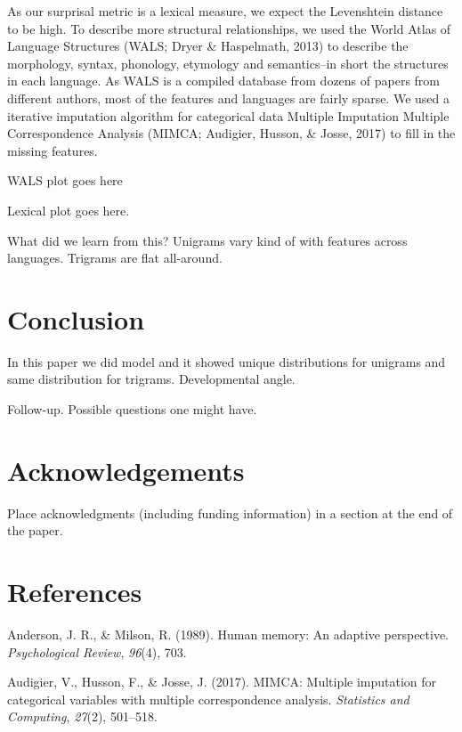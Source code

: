 \documentclass[10pt, letterpaper]{article}
\begin{document}
As our surprisal metric is a lexical measure, we expect the Levenshtein
distance to be high. To describe more structural relationships, we used
the World Atlas of Language Structures (WALS; Dryer \& Haspelmath, 2013)
to describe the morphology, syntax, phonology, etymology and
semantics--in short the structures in each language. As WALS is a
compiled database from dozens of papers from different authors, most of
the features and languages are fairly sparse. We used a iterative
imputation algorithm for categorical data Multiple Imputation Multiple
Correspondence Analysis (MIMCA; Audigier, Husson, \& Josse, 2017) to
fill in the missing features.

WALS plot goes here

Lexical plot goes here.

What did we learn from this? Unigrams vary kind of with features across
languages. Trigrams are flat all-around.

\hypertarget{conclusion}{%
\section{Conclusion}\label{conclusion}}

In this paper we did model and it showed unique distributions for
unigrams and same distribution for trigrams. Developmental angle.

Follow-up. Possible questions one might have.

\hypertarget{acknowledgements}{%
\section{Acknowledgements}\label{acknowledgements}}

Place acknowledgments (including funding information) in a section at
the end of the paper.

\hypertarget{references}{%
\section{References}\label{references}}

\setlength{\parindent}{-0.1in} 
\setlength{\leftskip}{0.125in}

\noindent

\hypertarget{refs}{}
\leavevmode\hypertarget{ref-anderson1989}{}%
Anderson, J. R., \& Milson, R. (1989). Human memory: An adaptive
perspective. \emph{Psychological Review}, \emph{96}(4), 703.

\leavevmode\hypertarget{ref-audigier2017}{}%
Audigier, V., Husson, F., \& Josse, J. (2017). MIMCA: Multiple
imputation for categorical variables with multiple correspondence
analysis. \emph{Statistics and Computing}, \emph{27}(2), 501--518.
\end{document}
